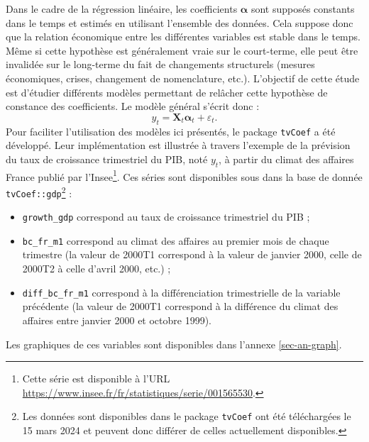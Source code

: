 \documentclass[
  a4paper,
  DIV=11,
  numbers=noendperiod,
  french]{scrartcl}
\newcommand\1{{\mathds 1}}
\newcommand{\bf}[1]{{\boldsymbol #1}}
\theoremstyle{remark}
\begin{document}
Dans le cadre de la régression linéaire, les coefficients \(\bf\alpha\)
sont supposés constants dans le temps et estimés en utilisant l'ensemble
des données. Cela suppose donc que la relation économique entre les
différentes variables est stable dans le temps. Même si cette hypothèse
est généralement vraie sur le court-terme, elle peut être invalidée sur
le long-terme du fait de changements structurels (mesures économiques,
crises, changement de nomenclature, etc.). L'objectif de cette étude est
d'étudier différents modèles permettant de relâcher cette hypothèse de
constance des coefficients. Le modèle général s'écrit donc : \[
y_t={\bf X_t} \bf\alpha_t  +\varepsilon_t.
\] Pour faciliter l'utilisation des modèles ici présentés, le package
 \texttt{tvCoef} \autocite{tvcoef} a été développé.
Leur implémentation est illustrée à travers l'exemple de la prévision du
taux de croissance trimestriel du PIB, noté \(y_t\), à partir du climat
des affaires France publié par l'Insee\footnote{ Cette série est
  disponible à l'URL
  \url{https://www.insee.fr/fr/statistiques/serie/001565530}.}. Ces
séries sont disponibles sous  dans la base de donnée
\texttt{tvCoef::gdp}\footnote{ Les données sont disponibles dans le
  package \texttt{tvCoef} ont été téléchargées le 15 mars 2024 et
  peuvent donc différer de celles actuellement disponibles.} :

\begin{itemize}
\item
  \texttt{growth\_gdp} correspond au taux de croissance trimestriel du
  PIB ;
\item
  \texttt{bc\_fr\_m1} correspond au climat des affaires au premier mois
  de chaque trimestre (la valeur de 2000T1 correspond à la valeur de
  janvier 2000, celle de 2000T2 à celle d'avril 2000, etc.) ;
\item
  \texttt{diff\_bc\_fr\_m1} correspond à la différenciation
  trimestrielle de la variable précédente (la valeur de 2000T1
  correspond à la différence du climat des affaires entre janvier 2000
  et octobre 1999).
\end{itemize}

Les graphiques de ces variables sont disponibles dans l'annexe
\ref{sec-an-graph}.
\end{document}
